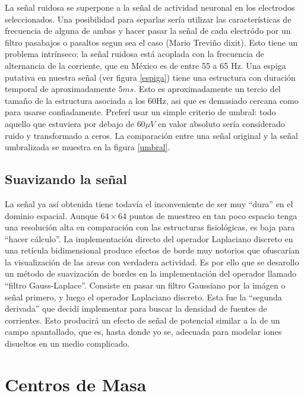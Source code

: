 \documentclass{article}
\begin{document}
La señal ruidosa se superpone a la señal de actividad neuronal en
los electrodos seleccionados. Una posibilidad para separlas
sería utilizar las características de frecuencia de alguna de ambas 
y hacer pasar la señal de cada electródo por un filtro pasabajos
o pasaltos segun sea el caso (Mario Treviño dixit).
Esto tiene un problema intrínseco: la señal ruidosa está acoplada
con la frecuencia de alternancia de la corriente, que en México es
de entre 55 a 65 Hz. Una espiga putativa en nuestra señal
(ver figura \ref{espiga}) tiene una estructura con duración
temporal de aproximadamente $5 ms$. Esto es aproximadamente 
un tercio del tamaño de la estructura asociada a los 60Hz,
asi que es demasiado cercana como para usarse confiadamente.
Preferí usar un simple criterio de umbral: todo aquello
que estuviera por debajo de $60\mu V$ en valor absoluto 
sería considerado ruido y transformado a ceros. La
comparación entre una señal original y la señal umbralizada
se muestra en la figura \ref{umbral}.

\subsection{Suavizando la señal}

La señal ya así obtenida tiene todavía el inconveniente
de ser muy ``dura'' en el dominio espacial. Aunque $64\times 64$
puntos de muestreo en tan poco espacio tenga una resolución
alta en comparación con las estructuras fisiológicas, es baja
para ``hacer cálculo''. La implementación directo del operador
Laplaciano discreto en una retícula bidimensional produce
efectos de borde muy notorios que ofuscarían la visualización
de las areas con verdadera actividad. Es por ello que se
desarollo un método de suavización de bordes en la  implementación
del operador llamado ``filtro Gauss-Laplace''. Consiste en pasar
un filtro Gaussiano por la imágen o señal primero, y luego el 
operador Laplaciano discreto. Esta fue la ``segunda derivada'' que
decidí implementar para buscar la densidad de fuentes de corrientes.
Esto producirá un efecto de señal de potencial similar a 
la de un campo apantallado, que es, hasta donde yo se,
 adecuada para modelar iones disueltos en un  medio
complicado.



\section{Centros de Masa}
\end{document}
